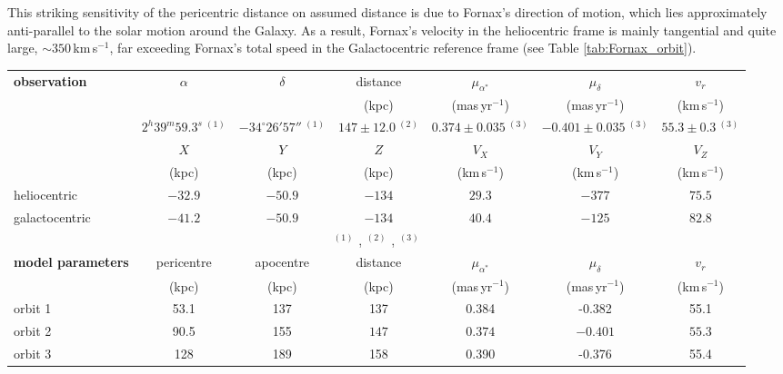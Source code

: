 \documentclass[fleqn,usenatbib]{mnras}
\begin{document}
This striking sensitivity of the pericentric distance on assumed distance is due to Fornax's direction of motion, which lies approximately anti-parallel to the solar motion around the Galaxy. As a result, Fornax's velocity in the heliocentric frame is  mainly tangential and quite large, $\sim 350$\,km\,s$^{-1}$, far exceeding  Fornax's total speed in the Galactocentric reference frame (see Table \ref{tab:Fornax_orbit}).
\begin{table*}
	\centering
	\caption{Current observational constraints, as well as parameters of the three orbits explored using $N$-body simulations in this study. Orbit 2 is the orbit corresponding to the median observed quantities. 
	The current positions and velocities of Fornax corresponding to orbits 1, 2 and 3, expressed as 6D Cartesian coordinates, lie each within at most one standard deviation of the ones derived by \citet{Helmi2018}. Pericentres and apocentres are computed for the Milky Way potential model discussed in section \ref{sec:host}, while heliocentric and galactocentric coordinates are computed with solar parameters of \citet{Schoenrich10}.}
	\label{tab:Fornax_orbit}
	\begin{tabular}{lcccccc}
    \hline
		 \bf{observation}                & $\alpha$        & $\delta$           & distance          &     $\mu_{\alpha^*}$  & $\mu_\delta$        & $v_r$\\
                    		 &  &  & (kpc) & (mas\,yr$^{-1}$) & (mas\,yr$^{-1}$) & (km\,s$^{-1}$)\\ \hline
		 & $2^h 39^m 59.3^s~^{(1)}$ & $-34^\circ 26' 57''~^{(1)}$ & $147 \pm 12.0~^{(2)}$    &     $0.374 \pm 0.035~^{(3)}$ &  $-0.401 \pm 0.035~^{(3)}$ & $55.3 \pm 0.3~^{(3)}$\\ \hline
		 & $X$        & $Y$           & $Z$          &     $V_X$  & $V_Y$        & $V_Z$\\
                    		 & (kpc) & (kpc) & (kpc) & (km\,s$^{-1}$) & (km\,s$^{-1}$)  & (km\,s$^{-1}$)\\ \hline
		 heliocentric & $-32.9$ & $-50.9$ & $-134$    &     $29.3$ &  $-377$ & $75.5$\\ \hline
		 galactocentric & $-41.2$ & $-50.9$ & $-134$    &     $40.4$ &  $-125$ & $82.8$\\ \hline
	\multicolumn{7}{c}{	$^{(1)}$ \citet{McConnachie2012} , $^{(2)}$ \citet{Pietrzynski2009}, $^{(3)}$ \citet{Fritz2018} } \\[0.3cm]
		\hline
		\bf{model parameters} & pericentre & apocentre & distance & $\mu_{\alpha^*}$ & $\mu_\delta$ & $v_r$\\
		 & (kpc) & (kpc) & (kpc) & (mas\,yr$^{-1}$) & (mas\,yr$^{-1}$) & (km\,s$^{-1}$)\\
		\hline
    orbit 1 & 53.1 & 137 & 137 & 0.384 & -0.382 & 55.1\\
		{orbit 2} & 90.5 & 155 & $147$ & $0.374$ & $-0.401$ & $55.3$\\
		orbit 3 & 128 & 189 & 158 & 0.390 & -0.376 & 55.4\\
		\hline

	\end{tabular}
      \end{table*}
\end{document}
